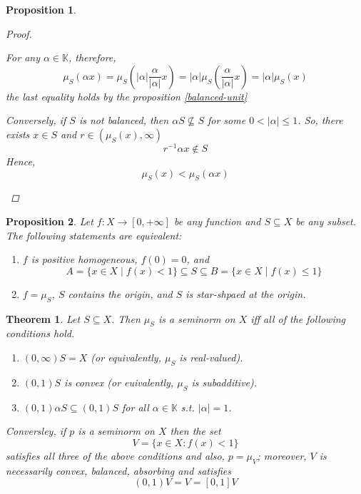 \documentclass[a4paper,12pt]{article}
\theoremstyle{definition}
\theoremstyle{plain}
\newtheorem{theorem}{Theorem}
\newtheorem{proposition}{Proposition}
\theoremstyle{remark}
\begin{document}
\begin{proposition}
\begin{proof}
\begin{enumerate}[label=(\alph*)]
            For any \(\alpha \in \mathbb{K}\), therefore,
            \[\mu_S(\alpha x) = \mu_S\left(|\alpha| \frac{\alpha}{|\alpha|}x\right)=|\alpha| \mu_S\left(\frac{\alpha}{|\alpha|}x\right) = |\alpha| \mu_S(x)\]
            the last equality holds by the proposition \ref{balanced-unit}

            Conversely, if \(S\) is not balanced, then \(\alpha S \nsubseteq S\) for some \(0<|\alpha| \le 1\). So, there exists \(x \in S\) and \(r \in (\mu_S(x),\infty)\)
            \[r^{-1}\alpha x \notin S\]
            Hence,
            \[ \mu_S(x) < \mu_S(\alpha x) \]
        \end{enumerate}
    \end{proof}
\end{proposition}

\begin{proposition}
    Let \(f: X \to [0,+\infty]\) be any function and \(S \subseteq X\) be any subset. The following statements are equivalent:
    \begin{enumerate}
        \item \(f\) is positive homogeneous, \(f(0)=0\), and
        \[A=\{x \in X \mid f(x)< 1\} \subseteq S \subseteq B = \{x \in X \mid f(x) \le 1\}\]

        \item \(f=\mu_S\), \(S\) contains the origin, and \(S\) is star-shpaed at the origin.
    \end{enumerate}
\end{proposition}

\begin{theorem}
    Let \(S \subseteq X\). Then \(\mu_S\) is a seminorm on \(X\) iff all of the following conditions hold.

    \begin{enumerate}
        \item \( (0,\infty)S = X \) (or equivalently, \(\mu_S\) is real-valued).
        \item \((0,1)S \) is convex (or euivalently, \(\mu_S\) is subadditive).
        \item \((0,1)\alpha S \subseteq (0,1)S\) for all \(\alpha \in \mathbb{K}\) s.t. \(|\alpha|=1\).
    \end{enumerate}

    Conversley, if \(p\) is a seminorm on \(X\) then the set
    \[V=\{x\in X: f(x)<1\}\]
    satisfies all three of the above conditions and also, \(p=\mu_V\); moreover, \(V\) is necessarily convex, balanced, absorbing and satisfies
    \[(0,1)V = V = [0,1]V\]
\end{theorem}
\end{document}
